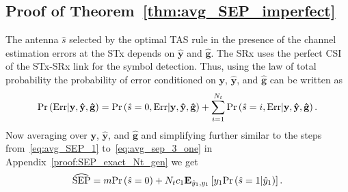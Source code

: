 \documentclass[12pt,draftcls,peerreview,onecolumn]{IEEEtran}
\newcommand{\brac}[1]{\left({#1}\right)}
\newcommand{\explow}[2]{{\bf{E}}_{#1}\left[{#2}\right]}
\newcommand{\prob}[1]{\text{Pr}\brac{#1}}
\newcommand{\given}{\arrowvert}
\newcommand{\y}{\mathbf{y}}
\newcommand{\nx}{{0}}
\newcommand{\Err}{{\text{Err}}}
\newcommand{\Nt}{{N_t}}
\newcommand{\puch}{g}
\newcommand{\ghatvec}{\mathbf{\hat{\puch}}}
\newcommand{\yhatvec}{\mathbf{\hat{y}}}
\newcommand{\cone}{c_{1}}
\newcommand{\m}{\cone}
\newcommand{\yk}[1]{y_{#1}}
\newcommand{\zerosep}{m}
\newcommand{\shat}{\hat{s}}
\newcommand{\ykhat}[1]{\hat{y}_{#1}}
\begin{document}
\subsection{Proof of Theorem~\ref{thm:avg_SEP_imperfect}}
\label{proof:avg_SEP_imperfect_CSI}
The antenna $\shat$ selected by the optimal TAS rule in the presence of the channel estimation errors at the STx depends on $\yhatvec$ and $\ghatvec$. The SRx uses the perfect CSI of the STx-SRx link for the symbol detection. Thus, using the law of total probability the probability of error conditioned on $\y$, $\yhatvec$, and $\ghatvec$ can be written as
%
\begin{equation}
\prob{\Err \given \y,\yhatvec,\ghatvec} =  \prob{\shat=\nx,\Err\given \y, \yhatvec,\ghatvec} + \sum_{i=1}^{\Nt}\prob{\shat=i,\Err\given\y,\yhatvec,\ghatvec}.
\label{eq:Perr_all_imp_csi}
\end{equation}  
%
Now averaging over $\y$, $\yhatvec$, and $\ghatvec$ and simplifying further similar to the steps from~\eqref{eq:avg_SEP_1} to~\eqref{eq:avg_sep_3_one} in Appendix~\ref{proof:SEP_exact_Nt_gen} we get
%
\begin{equation}
\label{eq:avg_SEP_3_IMP_CSI}
\avgSEPhat  = \zerosep \prob{\shat=\nx} + \Nt\m\explow{\ykhat{1},\yk{1}}{\yk{1}\prob{\shat=1\given \ykhat{1}}}.
\end{equation}
%
\end{document}
